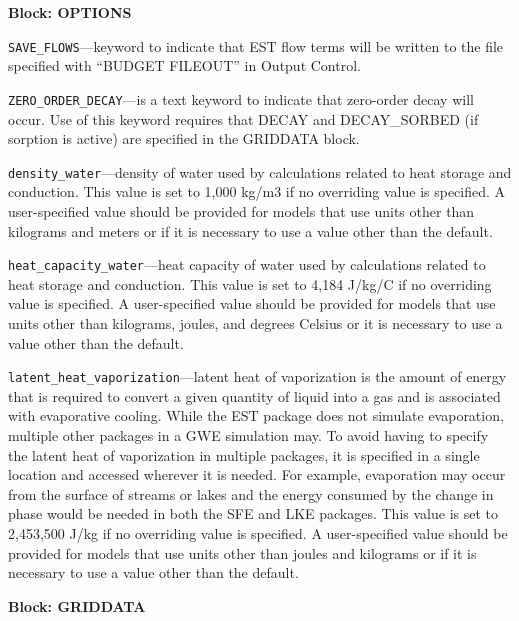 
\item \textbf{Block: OPTIONS}

\begin{description}
\item \texttt{SAVE\_FLOWS}---keyword to indicate that EST flow terms will be written to the file specified with ``BUDGET FILEOUT'' in Output Control.

\item \texttt{ZERO\_ORDER\_DECAY}---is a text keyword to indicate that zero-order decay will occur.  Use of this keyword requires that DECAY and DECAY\_SORBED (if sorption is active) are specified in the GRIDDATA block.

\item \texttt{density\_water}---density of water used by calculations related to heat storage and conduction.  This value is set to 1,000 kg/m3 if no overriding value is specified.  A user-specified value should be provided for models that use units other than kilograms and meters or if it is necessary to use a value other than the default.

\item \texttt{heat\_capacity\_water}---heat capacity of water used by calculations related to heat storage and conduction.  This value is set to 4,184 J/kg/C if no overriding value is specified.  A user-specified value should be provided for models that use units other than kilograms, joules, and degrees Celsius or it is necessary to use a value other than the default.

\item \texttt{latent\_heat\_vaporization}---latent heat of vaporization is the amount of energy that is required to convert a given quantity of liquid into a gas and is associated with evaporative cooling.  While the EST package does not simulate evaporation, multiple other packages in a GWE simulation may.  To avoid having to specify the latent heat of vaporization in multiple packages, it is specified in a single location and accessed wherever it is needed.  For example, evaporation may occur from the surface of streams or lakes and the energy consumed by the change in phase would be needed in both the SFE and LKE packages.  This value is set to 2,453,500 J/kg if no overriding value is specified.  A user-specified value should be provided for models that use units other than joules and kilograms or if it is necessary to use a value other than the default.

\end{description}
\item \textbf{Block: GRIDDATA}

